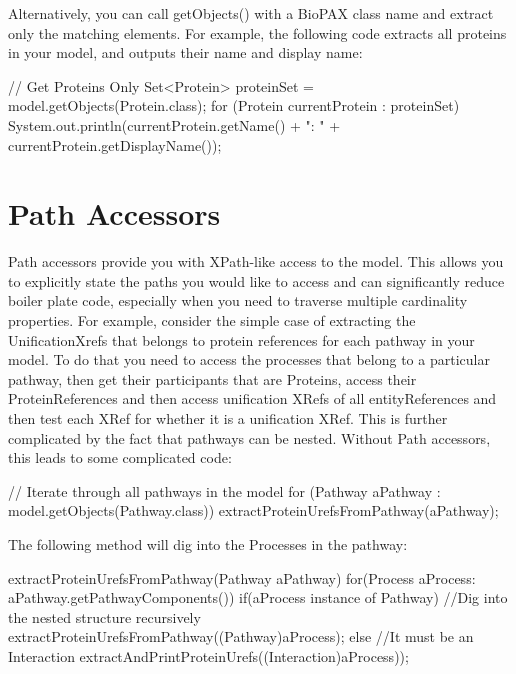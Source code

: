 \documentclass{tufte-book}
\begin{document}
Alternatively, you can call getObjects() with a BioPAX class name and extract only the matching elements. For example, the following code extracts all proteins in your model, and outputs their name and display name:

\begin{javacode}
// Get Proteins Only
Set<Protein> proteinSet = model.getObjects(Protein.class);
for (Protein currentProtein : proteinSet)
{
	System.out.println(currentProtein.getName() +
	 ": " + currentProtein.getDisplayName());
}
\end{javacode}

\section{Path Accessors}

Path accessors provide you with XPath-like access to the model. This allows you to explicitly state the paths you would like to access and can significantly reduce boiler plate code, especially when you need to traverse multiple cardinality properties. For example, consider the simple case of extracting the UnificationXrefs that belongs to protein references for each pathway in your model. To do that you need to access the processes that belong to a particular pathway, then get their participants  that are Proteins, access their ProteinReferences and then access unification XRefs of all entityReferences and then test each XRef for whether it is a unification XRef.  This is further complicated by the fact that pathways can be nested. Without Path accessors, this leads to some complicated code:

\begin{javacode}

// Iterate through all pathways in the model
 for (Pathway aPathway : model.getObjects(Pathway.class))
  extractProteinUrefsFromPathway(aPathway);
\end{javacode}

The following method will dig into the Processes in the pathway:  

\begin{javacode}
extractProteinUrefsFromPathway(Pathway aPathway)
{
 for(Process aProcess: aPathway.getPathwayComponents()) 
 {
  if(aProcess instance of Pathway)
  { //Dig into the nested structure recursively
   extractProteinUrefsFromPathway((Pathway)aProcess);
  }  else
  { //It must be an Interaction
   extractAndPrintProteinUrefs((Interaction)aProcess));
  }}}
\end{javacode}
\end{document}
